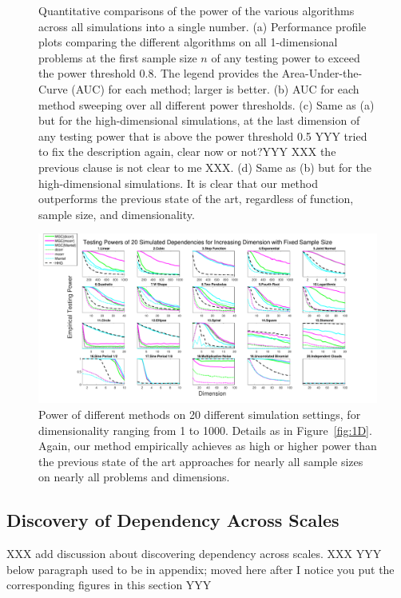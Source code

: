 \documentclass[11pt]{article}
\begin{document}
\begin{figure}[htbp]
{}
\caption{Quantitative comparisons of the power of the various algorithms across all simulations into a single number.  
(a) Performance profile plots comparing the different algorithms on all 1-dimensional problems at the first sample size $n$ of any testing power to exceed the power threshold 0.8. The legend provides the Area-Under-the-Curve (AUC) for each method; larger is better.
(b) AUC for each method sweeping over all different power thresholds.
(c) Same as (a) but for the high-dimensional simulations, at the last dimension of any testing power that is above the power threshold 0.5 YYY tried to fix the description again, clear now or not?YYY XXX the previous clause is not clear to me XXX.
(d) Same as (b) but for the high-dimensional simulations.
It is clear that our method outperforms the previous state of the art, regardless of function, sample size, and dimensionality.}
\label{fig:pp}
\end{figure}




\begin{figure}[htbp]
\includegraphics[width=1.0\textwidth]{../Figures/Fig5}
\caption{Power of different methods on 20 different simulation settings, for dimensionality ranging from 1 to 1000.  Details as in Figure~\ref{fig:1D}.
Again, our method empirically achieves as high or higher power than the previous state of the art approaches for nearly all sample sizes on nearly all problems and dimensions.
}
\label{fig:nD}
\end{figure}



\subsection{Discovery of Dependency Across Scales}


XXX add discussion about discovering dependency across scales. XXX
YYY below paragraph used to be in appendix; moved here after I notice you put the corresponding figures in this section YYY
\end{document}
